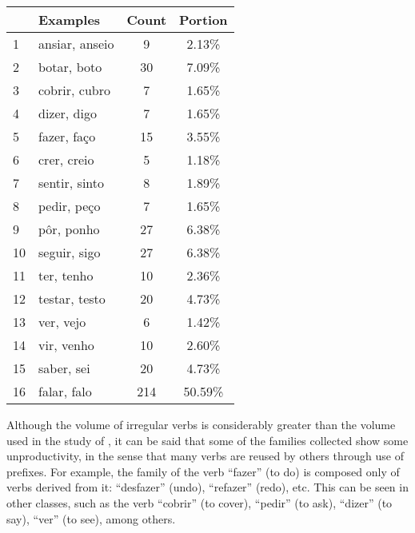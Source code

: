 \begin{table}[H]
\begin{center}
\begin{tabular}{|l|l|c|c|}
\toprule
 & Examples & Count & Portion\\
\midrule
1  & ansiar, anseio & 9 & 2.13\%\\
2  & botar, boto & 30 & 7.09\%\\
3  & cobrir, cubro & 7 & 1.65\%\\
4  & dizer, digo & 7 & 1.65\%\\
5 & fazer, faço & 15 & 3.55\%\\
6  & crer, creio & 5 & 1.18\%\\
7  & sentir, sinto & 8 & 1.89\% \\
8  & pedir, peço & 7 & 1.65\%\\
9  & pôr, ponho & 27 & 6.38\%\\
10  & seguir, sigo & 27 & 6.38\%\\
11  & ter, tenho & 10 & 2.36\%\\
12  & testar, testo & 20 & 4.73\%\\
13  & ver, vejo & 6 & 1.42\%\\
14  & vir, venho & 10 & 2.60\%\\
15 & saber, sei & 20 & 4.73\%\\
16  & falar, falo & 214 & 50.59\%\\
\bottomrule
\end{tabular}
\end{center}
\label{tab:classes}
\end{table}

Although the volume of irregular verbs is considerably greater than the volume used in the study of \cite{rumelhart:1986}, it can be said that some of the families collected show some unproductivity, in the sense that many verbs are reused by others through use of prefixes. For example, the family of the verb “fazer” (to do) is composed only of verbs derived from it: “desfazer” (undo), “refazer” (redo), etc. This can be seen in other classes, such as the verb “cobrir” (to cover), “pedir” (to ask), “dizer” (to say), “ver” (to see), among others. %

